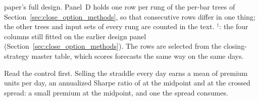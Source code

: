\begin{table}[H]
{%
paper's full design. Panel~D holds one row per rung of the per-bar trees
of Section~\ref{sec:close_option_methods}, so that consecutive rows differ in one
thing; the other trees and input sets of every rung are counted in the text.
$^{\dagger}$: the four columns still fitted on the
earlier design panel (Section~\ref{sec:close_option_methods}). The rows are
selected from the closing-strategy master table, which scores \cmMasterN{}
forecasts the same way on the same days.
\label{tab:close_option_rules}}
\resizebox{\textwidth}{!}{}
\end{table}

Read the control first. Selling the straddle every day earns a mean of
\cmShortMean{} premium units per day, an annualized Sharpe ratio of %
\cmShortShMid{} at the midpoint and \cmShortShX{} at the crossed spread: a %
small premium at the midpoint, and one the spread consumes.

